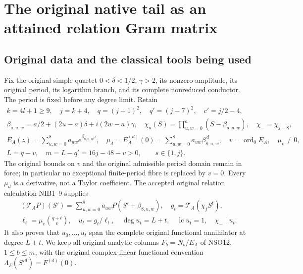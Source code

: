 \begingroup
\section{The original native tail as an attained relation Gram matrix}
\label{sec:NTG}

\subsection{Original data and the classical tools being used}
Fix the original simple quartet $0<\delta<1/2$, $\gamma>2$,
its nonzero amplitude, its original period, its logarithm branch,
and its complete nonreduced conductor. The period is fixed before
any degree limit. Retain
\[
\begin{gathered}
 k=4l+1\ge9,\quad j=k+4,\quad q=(j+1)^2,\quad q'=(j-7)^2,
 \quad c'=j/2-4,\\
 \beta_{a,u,w}=a/2+(2u-a)\delta+i(2w-a)\gamma,\quad
 \chi_a(S)=\prod_{u,w=0}^{a}(S-\beta_{a,u,w}),\quad
 \chi_-=\chi_{j-8},\\
 E_A(z)=\sum_{u,w=0}^{8}a_{uw}e^{\beta_{8,u,w}z},\quad
 \mu_d=E_A^{(d)}(0)=\sum_{u,w=0}^{8}a_{uw}\beta_{8,u,w}^{\,d},
 \quad v=\operatorname{ord}_0E_A,\quad\mu_v\ne0,\\
 L=q-v,\quad m=L-q'=16j-48-v>0,\qquad s\in\{1,j\}.
\end{gathered}                                                    \tag{NTG1}
\]
The original bounds on $v$ and the original admissible period
domain remain in force; in particular no exceptional finite-period
fibre is replaced by $v=0$. Every $\mu_d$ is a derivative,
not a Taylor coefficient. The accepted original relation
calculation NIB1--9 supplies
\[
\begin{gathered}
 (\mathcal T_AP)(S')=\sum_{u,w=0}^{8}a_{uw}P(S'+\beta_{8,u,w}),
 \quad g_t=\mathcal T_A(\chi_j S^t),\\
 \ell_t=\mu_v\binom{q+t}{v},\quad u_t=g_t/\ell_t,\quad
 \deg u_t=L+t,\quad\operatorname{lc}u_t=1,\quad \chi_-\mid u_t .
\end{gathered}                                                    \tag{NTG2}
\]
It also proves that $u_0,\ldots,u_t$ span the complete original
functional annihilator at degree $L+t$. We keep all original
analytic columns $F_b=N_b/E_A$ of NSO12, $1\le b\le m$, with
the original complex-linear functional convention
$\Lambda_F(S'^d)=F^{(d)}(0)$.

